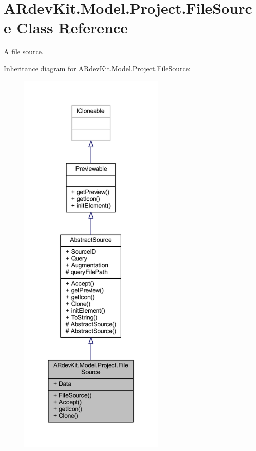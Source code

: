 \hypertarget{class_a_rdev_kit_1_1_model_1_1_project_1_1_file_source}{\section{A\-Rdev\-Kit.\-Model.\-Project.\-File\-Source Class Reference}
\label{class_a_rdev_kit_1_1_model_1_1_project_1_1_file_source}
}


A file source.  




Inheritance diagram for A\-Rdev\-Kit.\-Model.\-Project.\-File\-Source\-:
\nopagebreak
\begin{figure}[H]
\begin{center}
\leavevmode
\includegraphics[height=550pt]{class_a_rdev_kit_1_1_model_1_1_project_1_1_file_source__inherit__graph}
\end{center}
\end{figure}


